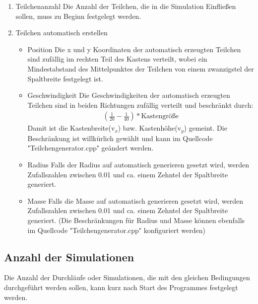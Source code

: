 \documentclass[14pt,a4paper]{scrartcl}
\begin{document}
\begin{enumerate}

\item Teilchenanzahl
\newline
Die Anzahl der Teilchen, die in die Simulation Einfließen sollen, muss zu Beginn festgelegt werden.

\item Teilchen automatisch erstellen

\begin{itemize}

\item Position
\newline
Die x und y Koordinaten der automatisch erzeugten Teilchen sind zufällig im rechten Teil des Kastens verteilt, wobei ein Mindestabstand des Mittelpunktes der Teilchen von einem zwanzigstel der Spaltbreite festgelegt ist.

\item Geschwindigkeit
\newline
Die Geschwindigkeiten der automatisch erzeugten Teilchen sind in beiden Richtungen zufällig verteilt und beschränkt durch:
\begin{align*}
(\frac{1}{20}-\frac{1}{40})*\text{Kastengröße}
\end{align*}
Damit ist die Kastenbreite(v$_x$) bzw. Kastenhöhe(v$_y$)
gemeint. Die Beschränkung ist willkürlich gewählt und kann im Quellcode "Teilchengenerator.cpp" geändert werden.
\item Radius
\newline
Falls der Radius auf automatisch generieren gesetzt wird, werden Zufallszahlen zwischen 0.01 und ca. einem Zehntel der Spaltbreite generiert.
\item Masse
\newline
Falls die Masse auf automatisch generieren gesetzt wird,
werden Zufallszahlen zwischen 0.01 und ca. einem Zehntel der Spaltbreite generiert. (Die Beschränkungen für Radius und Masse können ebenfalls im Quellcode "Teilchengenerator.cpp" konfiguriert werden) 

\end{itemize}
\end{enumerate}
\subsection{Anzahl der Simulationen}
Die Anzahl der Durchläufe oder Simulationen, die mit den gleichen Bedingungen durchgeführt werden sollen, kann kurz nach Start des Programmes festgelegt werden.
\end{document}
